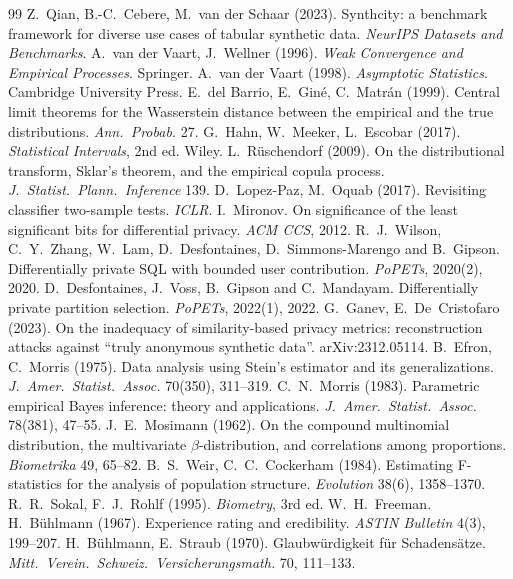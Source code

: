 \documentclass[11pt,a4paper]{article}
\theoremstyle{definition}
\theoremstyle{remark}
\begin{document}
\begin{thebibliography}{99}
 Z.~Qian, B.-C.~Cebere, M.~van der Schaar (2023). Synthcity: a benchmark framework for diverse use cases of tabular synthetic data. \emph{NeurIPS Datasets and Benchmarks}.
 A.~van der Vaart, J.~Wellner (1996). \emph{Weak Convergence and Empirical Processes}. Springer.
 A.~van der Vaart (1998). \emph{Asymptotic Statistics}. Cambridge University Press.
 E.~del Barrio, E.~Gin\'e, C.~Matr\'an (1999). Central limit theorems for the Wasserstein distance between the empirical and the true distributions. \emph{Ann.\ Probab.} 27.
 G.~Hahn, W.~Meeker, L.~Escobar (2017). \emph{Statistical Intervals}, 2nd ed. Wiley.
 L.~R\"uschendorf (2009). On the distributional transform, Sklar's theorem, and the empirical copula process. \emph{J.\ Statist.\ Plann.\ Inference} 139.
 D.~Lopez-Paz, M.~Oquab (2017). Revisiting classifier two-sample tests. \emph{ICLR}.
 I.~Mironov. On significance of the least significant bits for differential privacy. \emph{ACM CCS}, 2012.
 R.~J.~Wilson, C.~Y.~Zhang, W.~Lam, D.~Desfontaines, D.~Simmons-Marengo and B.~Gipson. Differentially private SQL with bounded user contribution. \emph{PoPETs}, 2020(2), 2020.
 D.~Desfontaines, J.~Voss, B.~Gipson and C.~Mandayam. Differentially private partition selection. \emph{PoPETs}, 2022(1), 2022.
 G.~Ganev, E.~De~Cristofaro (2023). On the inadequacy of similarity-based privacy metrics: reconstruction attacks against ``truly anonymous synthetic data''. arXiv:2312.05114.
 B.~Efron, C.~Morris (1975). Data analysis using Stein's estimator and its generalizations. \emph{J.\ Amer.\ Statist.\ Assoc.} 70(350), 311--319.
 C.~N.~Morris (1983). Parametric empirical Bayes inference: theory and applications. \emph{J.\ Amer.\ Statist.\ Assoc.} 78(381), 47--55.
 J.~E.~Mosimann (1962). On the compound multinomial distribution, the multivariate $\beta$-distribution, and correlations among proportions. \emph{Biometrika} 49, 65--82.
 B.~S.~Weir, C.~C.~Cockerham (1984). Estimating F-statistics for the analysis of population structure. \emph{Evolution} 38(6), 1358--1370.
 R.~R.~Sokal, F.~J.~Rohlf (1995). \emph{Biometry}, 3rd ed. W.~H.~Freeman.
 H.~B\"uhlmann (1967). Experience rating and credibility. \emph{ASTIN Bulletin} 4(3), 199--207.
 H.~B\"uhlmann, E.~Straub (1970). Glaubw\"urdigkeit f\"ur Schadens\"atze. \emph{Mitt.\ Verein.\ Schweiz.\ Versicherungsmath.} 70, 111--133.

\end{thebibliography}
\end{document}
